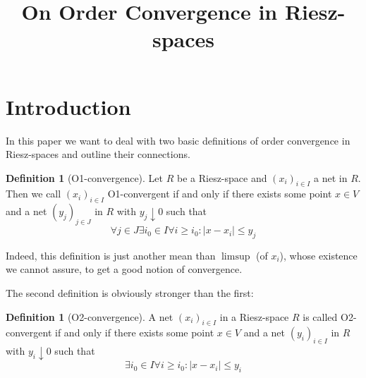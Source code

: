 \documentclass{article}
\theoremstyle{definition}
\newtheorem{definition}[theorem]{Definition}
\theoremstyle{remark}
\renewcommand{\mod}[1]{\left| #1\right|} %
\begin{document}

\title{On Order Convergence in Riesz-spaces}








\maketitle

\tableofcontents

\section{Introduction}

In this paper we want to deal with two basic definitions of order convergence in Riesz-spaces and outline their connections.

\begin{definition}[O1-convergence]\label{o1}
Let $R$ be a Riesz-space and $(x_i)_{i\in I}$ a net in $R$. Then we call $(x_i)_{i\in I}$ O1-convergent if and only if there exists some point $x\in V$ and a net $(y_j)_{j\in J}$ in $R$ with $y_j\downarrow 0$ such that
\begin{equation}
\forall j\in J \exists i_0\in I \forall i\geq i_0 : \mod{x-x_i}\leq y_j
\end{equation}
\end{definition}

Indeed, this definition is just another mean than $\limsup$ (of $x_i$), whose existence we cannot assure, to get a good notion of convergence.

The second definition is obviously stronger than the first:

\begin{definition}[O2-convergence]\label{o2}
A net $(x_i)_{i\in I}$ in a Riesz-space $R$ is called O2-convergent if and only if there exists some point $x\in V$ and a net $(y_i)_{i\in I}$ in $R$ with $y_i\downarrow 0$ such that
\begin{equation}
\exists i_0\in I \forall i\geq i_0 : \mod{x-x_i}\leq y_i
\end{equation}
\end{definition}
\end{document}
